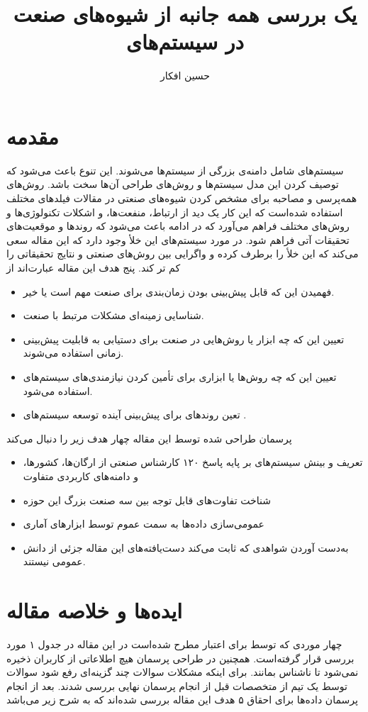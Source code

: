 \documentclass[a4paper, 11pt]{article}
\title{
    یک بررسی همه جانبه از شیوه‌های صنعت در سیستم‌های
    \lr{real-time}
}
\author{حسین افکار}
\begin{document}
\maketitle

\section{مقدمه}
سیستم‌های
شامل دامنه‌ی بزرگی از سیستم‌ها می‌شوند. این تنوع باعث می‌شود که توصیف کردن این مدل سیستم‌ها
و روش‌های طراحی آن‌ها سخت باشد.
روش‌های همه‌پرسی و مصاحبه برای مشخص کردن شیوه‌های صنعتی در مقالات فیلد‌های مختلف استفاده
شده‌است که این کار یک دید از ارتباط، منفعت‌ها، و اشکلات تکنولوژی‌ها و روش‌های مختلف فراهم می‌آورد
که در ادامه باعث می‌شود که روند‌ها و موقعیت‌های تحقیقات آتی فراهم شود.
در مورد سیستم‌های
این خلأ وجود دارد که این مقاله سعی می‌کند که این خلأ را برطرف کرده و واگرایی بین روش‌های صنعتی
و نتایج تحقیقاتی را کم تر کند.
پنج هدف این مقاله عبارت‌اند از
\begin{itemize}
    \item فهمیدن این که قابل پیش‌بینی بودن زمان‌بندی برای صنعت مهم است یا خیر.
    \item شناسایی زمینه‌ای مشکلات مرتبط با صنعت.
    \item تعیین‌ این که چه ابزار یا روش‌هایی در صنعت برای دستیابی
    به قابلیت پیش‌بینی زمانی استفاده می‌شوند.
    \item تعیین این که چه روش‌ها یا ابزاری برای تأمین کردن نیازمندی‌های سیستم‌های
    استفاده می‌شود.
    \item تعین روند‌های برای پیش‌بینی آینده توسعه سیستم‌های
    .
\end{itemize}
پرسمان طراحی شده توسط این مقاله چهار هدف زیر را دنبال می‌کند
\begin{itemize}
    \item تعریف و بینش سیستم‌های
    بر پایه پاسخ ۱۲۰ کارشناس صنعتی از ارگان‌ها، کشور‌ها، و دامنه‌های کاربردی متفاوت
    \item شناخت تفاوت‌های قابل توجه بین سه صنعت بزرگ این حوزه
    \item عمومی‌سازی داده‌ها به سمت عموم توسط ابزار‌های آماری
    \item به‌دست آوردن شواهدی که ثابت می‌کند دست‌یافته‌های این مقاله جزئی از دانش عمومی
    نیستند.
\end{itemize}
\section{ایده‌ها و خلاصه مقاله}
چهار موردی که توسط
برای اعتبار مطرح شده‌است در این مقاله در جدول ۱ مورد بررسی قرار گرفته‌است.
همچنین در طراحی پرسمان هیچ اطلاعاتی از کاربران ذخیره نمی‌شود تا ناشناس بمانند. 
برای اینکه مشکلات سوالات چند گزینه‌ای رفع شود سوالات توسط یک تیم از متخصصات قبل از انجام
پرسمان نهایی بررسی شدند.
بعد از انجام پرسمان داده‌ها برای احقاق ۵ هدف این مقاله بررسی شده‌اند که به شرح زیر می‌باشد
\end{document}
